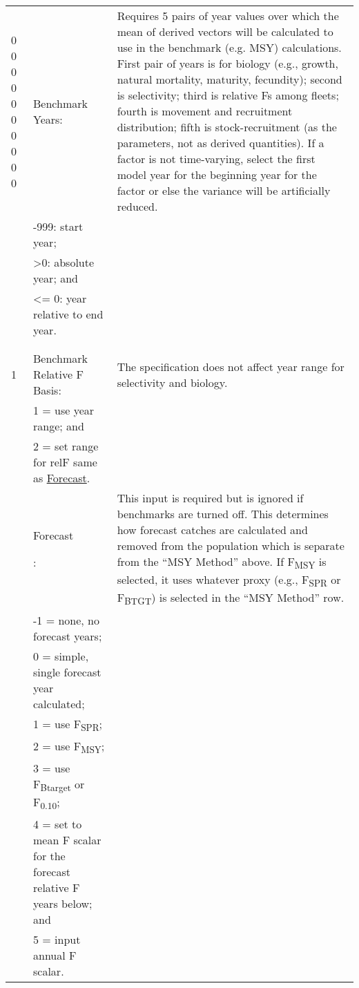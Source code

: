 \begin{landscape}
{\begin{longtable}{p{2cm} p{7cm} p{12cm}}
    
  \hline
  \multirow{1}{1cm}[-0.15cm]{\parbox{2cm}{0 0 0 0 0 0 0 0 0 0}} & Benchmark Years: & \multirow{1}{1cm}[-0.15cm]{\parbox{12cm}{Requires 5 pairs of year values over which the mean of derived vectors will be calculated to use in the benchmark (e.g. MSY) calculations. First pair of years is for biology (e.g., growth, natural mortality, maturity, fecundity); second is selectivity; third is relative Fs among fleets; fourth is movement and recruitment distribution; fifth is stock-recruitment (as the parameters, not as derived quantities). If a factor is not time-varying, select the first model year for the beginning year for the factor or else the variance will be artificially reduced.}} \Tstrut\\
    & -999: start year; & \\
    & >0: absolute year; and & \\
    & <= 0: year relative to end year. & \Bstrut\\
    & & \Bstrut\\
    & & \Bstrut\\

  \hline
  1 & Benchmark Relative F Basis: & \multirow{1}{1cm}[-0.2cm]{\parbox{12cm}{The specification does not affect year range for selectivity and biology.}} \Tstrut\\
    & 1 = use year range; and & \\
    & 2 = set range for relF same as \hyperlink{Fcast}{Forecast}. & \Bstrut\\

  \pagebreak
  \hline
  2 & \hypertarget{Fcast}{Forecast}: & \multirow{1}{1cm}[-0.25cm]{\parbox{12cm}{This input is required but is ignored if benchmarks are turned off. This determines how forecast catches are calculated and removed from the population which is separate from the ``MSY Method'' above. If F\textsubscript{MSY} is selected, it uses whatever proxy (e.g., F\textsubscript{SPR} or F\textsubscript{BTGT}) is selected in the ``MSY Method'' row.}} \Tstrut\\
    & -1 = none, no forecast years; & \\
    & 0 = simple, single forecast year calculated; & \\
    & 1 = use F\textsubscript{SPR}; & \\
    & 2 = use F\textsubscript{MSY}; & \\
    & 3 = use F\textsubscript{Btarget} or F\textsubscript{0.10}; & \\
    & 4 = set to mean F scalar for the forecast relative F years below; and & \\
    & 5 = input annual F scalar. & \Bstrut\\


\end{longtable}}
\end{landscape}
